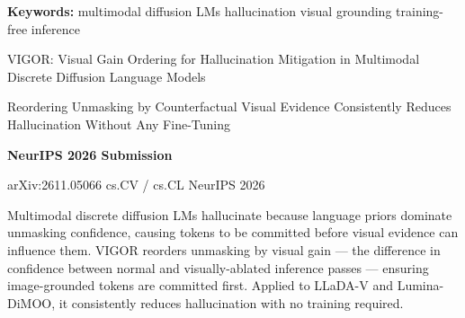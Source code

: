 \documentclass[10pt,twocolumn]{article}
\begin{document}
\setlength{\parindent}{0pt}
\setlength{\parskip}{4pt}

{\small\color{keywordgray}\textbf{Keywords:}
  multimodal diffusion LMs \textbullet{}
  hallucination \textbullet{}
  visual grounding \textbullet{}
  training-free inference}\par\vspace{4pt}

{\LARGE\bfseries\raggedright
  VIGOR: Visual Gain Ordering for Hallucination Mitigation in Multimodal
  Discrete Diffusion Language Models}\par\vspace{4pt}

{\large\itshape\raggedright
  Reordering Unmasking by Counterfactual Visual Evidence Consistently Reduces
  Hallucination Without Any Fine-Tuning}\par\vspace{6pt}

{\small\textbf{NeurIPS 2026 Submission}}\par\vspace{2pt}

{\small\color{keywordgray}arXiv:2611.05066 \textbullet{}
  cs.CV / cs.CL \textbullet{} NeurIPS 2026}
\par\vspace{2pt}\noindent{\color{rulered}\rule{\columnwidth}{0.6pt}}\vspace{6pt}

Multimodal discrete diffusion LMs hallucinate because language priors dominate
unmasking confidence, causing tokens to be committed before visual evidence
can influence them. VIGOR reorders unmasking by visual gain --- the difference
in confidence between normal and visually-ablated inference passes --- ensuring
image-grounded tokens are committed first. Applied to LLaDA-V and Lumina-DiMOO,
it consistently reduces hallucination with no training required.
\end{document}
